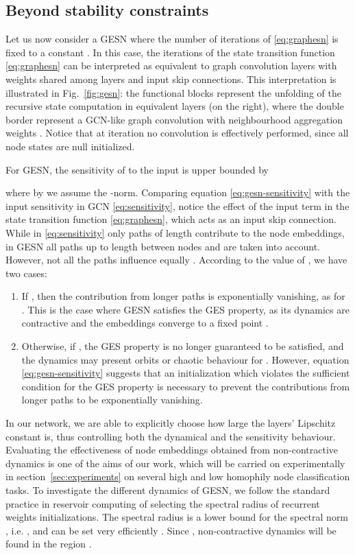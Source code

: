 \documentclass[final,5p,times,twocolumn]{elsarticle}
\begin{document}
\subsection{Beyond stability constraints}

Let us now consider a GESN where the number of iterations of \eqref{eq:graphesn} is fixed to a constant .
In this case, the  iterations of the state transition function \eqref{eq:graphesn} can be interpreted as equivalent to  graph convolution layers with weights shared among layers and input skip connections.
This interpretation is illustrated in Fig.~\ref{fig:gesn}: the functional blocks represent the unfolding of the recursive state computation in equivalent layers (on the right), where the double border represent a GCN-like graph convolution with neighbourhood aggregation weights .
Notice that at iteration  no convolution is effectively performed, since all node states are null initialized.

For GESN, the sensitivity of  to the input  is upper bounded by

where by  we assume the -norm.
Comparing equation \eqref{eq:gesn-sensitivity} with the input sensitivity in GCN \eqref{eq:sensitivity}, notice the effect of the input term in the state transition function \eqref{eq:graphesn}, which acts as an input skip connection.
While in \eqref{eq:sensitivity} only paths of length  contribute to the node embeddings, in GESN all paths up to length  between nodes  and  are taken into account.
However, not all the paths influence equally .
According to the value of , we have two cases:
\begin{enumerate}
	\item If , then the contribution from longer paths is exponentially vanishing, as  for . This is the case where GESN satisfies the GES property, as its dynamics are contractive and the embeddings converge to a fixed point .
	\item Otherwise, if , the GES property is no longer guaranteed to be satisfied, and the dynamics may present orbits or chaotic behaviour for . However, equation \eqref{eq:gesn-sensitivity} suggests that an initialization which violates the sufficient condition for the GES property is necessary to prevent the contributions from longer paths to be exponentially vanishing.
\end{enumerate}
In our network, we are able to explicitly choose how large the layers' Lipschitz constant  is, thus controlling both the dynamical and the sensitivity behaviour.
Evaluating the effectiveness of node embeddings obtained from non-contractive dynamics is one of the aims of our work, which will be carried on experimentally in section~\ref{sec:experiments} on several high and low homophily node classification tasks.
To investigate the different dynamics of GESN, we follow the standard practice in reservoir computing of selecting the spectral radius  of recurrent weights initializations.
The spectral radius is a lower bound for the spectral norm \cite{Goldberg1974}, i.e. , and can be set very efficiently \cite{Gallicchio2020inns}.
Since , non-contractive dynamics will be found in the region .
\end{document}
